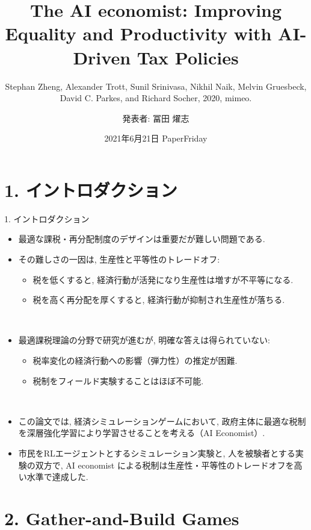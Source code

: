 \documentclass[unicode,aspectratio=169,11pt]{beamer}
\title{
    The AI economist:
    Improving Equality and Productivity with AI-Driven Tax Policies
}
\subtitle{Stephan Zheng, Alexander Trott, Sunil Srinivasa, Nikhil Naik, Melvin Gruesbeck, David C. Parkes, and Richard Socher, 2020, mimeo.}
\author{発表者: 冨田 燿志}
\date{2021年6月21日 PaperFriday}
\begin{document}
\maketitle

\section{1. イントロダクション}
\begin{frame}{1. イントロダクション}
    \begin{itemize}
        \item 最適な課税・再分配制度のデザインは重要だが難しい問題である.
        \item その難しさの一因は, 生産性と平等性のトレードオフ:
        \begin{itemize}
            \item 税を低くすると, 経済行動が活発になり生産性は増すが不平等になる.
            \item 税を高く再分配を厚くすると, 経済行動が抑制され生産性が落ちる.
        \end{itemize}
        　\\
        \item 最適課税理論の分野で研究が進むが, 明確な答えは得られていない:
        \begin{itemize}
            \item 税率変化の経済行動への影響（弾力性）の推定が困難.
            \item 税制をフィールド実験することはほぼ不可能.
        \end{itemize}
        　\\
        \item この論文では, 経済シミュレーションゲームにおいて, 政府主体に最適な税制を深層強化学習により学習させることを考える（AI Economist）.
        \item 市民をRLエージェントとするシミュレーション実験と, 人を被験者とする実験の双方で, AI economist による税制は生産性・平等性のトレードオフを高い水準で達成した.
    \end{itemize}
\end{frame}

\section{2. Gather-and-Build Games}

\end{document}
